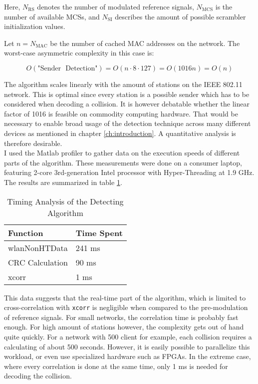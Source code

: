 Here, $ N_{\text{RS}} $ denotes the number of modulated reference signals, $ N_{\text{MCS}} $ is the number of available \glspl{MCS}, and $ N_{\text{SI}} $ describes the amount of possible scrambler initialization values.

Let $ n = N_{\text{MAC}} $ be the number of cached MAC addresses on the network. The worst-case asymmetric complexity in this case is:

$$ O(\text{"Sender ~Detection"}) = O(n \cdot 8 \cdot 127) = O(1016 n) = O(n) $$\vspace{0cm}

The algorithm scales linearly with the amount of stations on the IEEE 802.11 network. This is optimal since every station is a possible sender which has to be considered when decoding a collision. It is however debatable whether the linear factor of 1016 is feasible on commodity computing hardware. That would be necessary to enable broad usage of the detection technique across many different devices as mentioned in chapter \ref{ch:introduction}. A quantitative analysis is therefore desirable.\\

I used the Matlab profiler to gather data on the execution speeds of different parts of the algorithm. These measurements were done on a consumer laptop, featuring 2-core 3rd-generation Intel processor with Hyper-Threading at 1.9 GHz. The results are summarized in table \ref{tbl:timing}.

\begin{table}[ht]
	\centering
	\begin{tabular}{|p{8.5cm}|p{2.5cm}|}
		\hline
		\textbf{Function} & \textbf{Time Spent} \\ \hline
    wlanNonHTData & 241 ms \\ \hline
    CRC Calculation & 90 ms \\ \hline
		xcorr & 1 ms \\ \hline
	\end{tabular}
	\caption{Timing Analysis of the Detecting Algorithm \label{tbl:timing}}
\end{table}

This data suggests that the real-time part of the algorithm, which is limited to cross-correlation with \texttt{xcorr} is negligible when compared to the pre-modulation of reference signals. For small networks, the correlation time is probably fast enough. For high amount of stations however, the complexity gets out of hand quite quickly. For a network with 500 client for example, each collision requires a calculating of about 500 seconds. However, it is easily possible to parallelize this workload, or even use specialized hardware such as \glspl{FPGA}. In the extreme case, where every correlation is done at the same time, only 1 ms is needed for decoding the collision.

